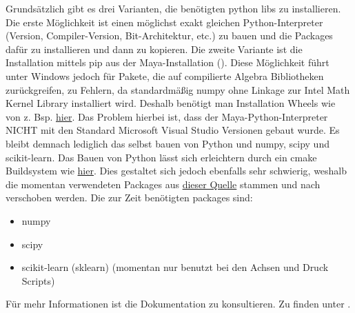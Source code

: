 \documentclass[a4paper, openany, oneside]{memoir}
\begin{document}
Grundsätzlich gibt es drei Varianten, die benötigten python libs zu installieren. Die erste Möglichkeit ist einen möglichst exakt gleichen Python-Interpreter (Version, Compiler-Version, Bit-Architektur, etc.) zu bauen und die Packages dafür zu installieren und dann zu kopieren. Die zweite Variante ist die Installation mittels pip aus der Maya-Installation (). Diese Möglichkeit führt unter Windows jedoch für Pakete, die auf compilierte Algebra Bibliotheken zurückgreifen, zu Fehlern, da standardmäßig numpy ohne Linkage zur Intel Math Kernel Library installiert wird. Deshalb benötigt man Installation Wheels wie von z. Bsp. \href{https://www.lfd.uci.edu/~gohlke/pythonlibs/#numpy}{hier}. Das Problem hierbei ist, dass der Maya-Python-Interpreter NICHT mit den Standard Microsoft Visual Studio Versionen gebaut wurde. Es bleibt demnach lediglich das selbst bauen von Python und numpy, scipy und scikit-learn. Das Bauen von Python lässt sich erleichtern durch ein cmake Buildsystem wie \href{https://github.com/python-cmake-buildsystem/python-cmake-buildsystem}{hier}. Dies gestaltet sich jedoch ebenfalls sehr schwierig, weshalb die momentan verwendeten Packages aus \href{https://drive.google.com/drive/folders/0BwsYd1k8t0lEfjJqV21yTnd2elVhNXEyTXhHclhxbDhvWVF5WWZUeVFISWViaFh1TzhrNTQ}{dieser Quelle} stammen und nach  verschoben werden. Die zur Zeit benötigten packages sind:
\begin{itemize}
\item numpy
\item scipy
\item scikit-learn (sklearn) (momentan nur benutzt bei den Achsen und Druck Scripts)
\end{itemize}
Für mehr Informationen ist die Dokumentation zu konsultieren. Zu finden unter .
\end{document}
